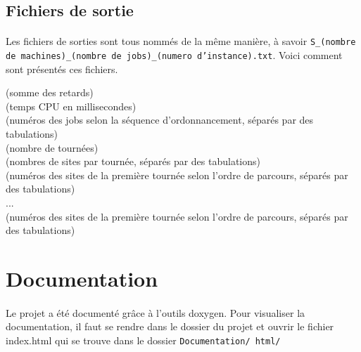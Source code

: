 	\subsection{Fichiers de sortie}
	
	\paragraph{}
	Les fichiers de sorties sont tous nommés de la même manière, à savoir \texttt{S\_(nombre de machines)\_(nombre de jobs)\_(numero d'instance).txt}. Voici comment sont présentés ces fichiers. 
	\begin{flushleft}
	(somme des retards) \\
	(temps CPU en millisecondes) \\
	(numéros des jobs selon la séquence d'ordonnancement, séparés par des tabulations) \\
	(nombre de tournées) \\
	(nombres de sites par tournée, séparés par des tabulations) \\
	(numéros des sites de la première tournée selon l'ordre de parcours, séparés par des tabulations) \\
	... \\
	(numéros des sites de la première tournée selon l'ordre de parcours, séparés par des tabulations) \\
	\end{flushleft}
%

	\section{Documentation}
	
	\paragraph{}
	Le projet a été documenté grâce à l'outils doxygen. Pour visualiser la documentation, il faut se rendre dans le dossier du projet et ouvrir le fichier index.html qui se trouve dans le dossier \texttt{Documentation/ html/}
%